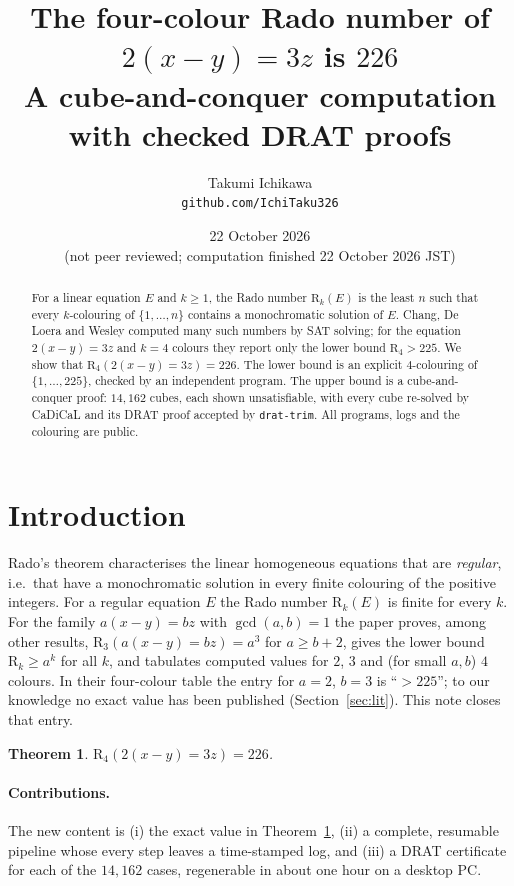 \documentclass[11pt,a4paper]{article}
\title{The four-colour Rado number of $2(x-y)=3z$ is $226$\\[2pt]
\large A cube-and-conquer computation with checked DRAT proofs}
\author{Takumi Ichikawa\\ \small\texttt{github.com/IchiTaku326}}
\date{22 October 2026\\ \small (not peer reviewed; computation finished 22 October 2026 JST)}
\newtheorem{theorem}{Theorem}
\theoremstyle{remark}
\newcommand{\R}{\mathrm{R}}
\begin{document}
\maketitle

\begin{abstract}
For a linear equation $E$ and $k\ge 1$, the Rado number $\R_k(E)$ is the least $n$ such that every
$k$-colouring of $\{1,\dots,n\}$ contains a monochromatic solution of $E$.
Chang, De Loera and Wesley \cite{CDW22} computed many such numbers by SAT solving; for the equation
$2(x-y)=3z$ and $k=4$ colours they report only the lower bound $\R_4>225$.
We show that $\R_4(2(x-y)=3z)=226$.
The lower bound is an explicit $4$-colouring of $\{1,\dots,225\}$, checked by an independent program.
The upper bound is a cube-and-conquer proof: $14{,}162$ cubes, each shown unsatisfiable, with every
cube re-solved by CaDiCaL and its DRAT proof accepted by \texttt{drat-trim}.
All programs, logs and the colouring are public.
\end{abstract}

\section{Introduction}
Rado's theorem \cite{Rado33} characterises the linear homogeneous equations that are \emph{regular}, i.e.\ that have a
monochromatic solution in every finite colouring of the positive integers.
For a regular equation $E$ the Rado number $\R_k(E)$ is finite for every $k$.
For the family $a(x-y)=bz$ with $\gcd(a,b)=1$ the paper \cite{CDW22} proves, among other results, $\R_3(a(x-y)=bz)=a^3$ for $a\ge b+2$,
gives the lower bound $\R_k\ge a^k$ for all $k$, and tabulates computed values for $2$, $3$ and (for small $a,b$) $4$ colours.
In their four-colour table the entry for $a=2$, $b=3$ is ``$>225$''; to our knowledge no exact value has been published
(Section~\ref{sec:lit}).
This note closes that entry.

\begin{theorem}\label{thm:main}
$\R_4(2(x-y)=3z)=226$.
\end{theorem}

\paragraph{Contributions.}
The new content is (i) the exact value in Theorem~\ref{thm:main}, (ii) a complete, resumable pipeline whose every step
leaves a time-stamped log, and (iii) a DRAT certificate for each of the $14{,}162$ cases, regenerable in about one hour on a desktop PC.
\end{document}
